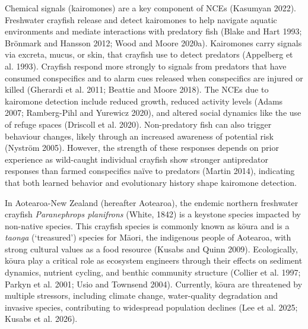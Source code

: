 \documentclass[
  12pt,
  a4paper,
]{scrbook}
\begin{document}
Chemical signals (kairomones) are a key component of NCEs (Kasumyan
2022). Freshwater crayfish release and detect kairomones to help
navigate aquatic environments and mediate interactions with predatory
fish (Blake and Hart 1993; Brönmark and Hansson 2012; Wood and Moore
2020a). Kairomones carry signals via excreta, mucus, or skin, that
crayfish use to detect predators (Appelberg et al. 1993). Crayfish
respond more strongly to signals from predators that have consumed
conspecifics and to alarm cues released when conspecifics are injured or
killed (Gherardi et al. 2011; Beattie and Moore 2018). The NCEs due to
kairomone detection include reduced growth, reduced activity levels
(Adams 2007; Ramberg-Pihl and Yurewicz 2020), and altered social
dynamics like the use of refuge spaces (Driscoll et al. 2020).
Non-predatory fish can also trigger behaviour changes, likely through an
increased awareness of potential risk (Nyström 2005). However, the
strength of these responses depends on prior experience as wild-caught
individual crayfish show stronger antipredator responses than farmed
conspecifics naïve to predators (Martin 2014), indicating that both
learned behavior and evolutionary history shape kairomone detection.

In Aotearoa-New Zealand (hereafter Aotearoa), the endemic northern
freshwater crayfish \emph{Paranephrops planifrons} (White, 1842) is a
keystone species impacted by non-native species. This crayfish species
is commonly known as kōura and is a \emph{taonga} (`treasured') species
for Māori, the indigenous people of Aotearoa, with strong cultural
values as a food resource (Kusabs and Quinn 2009). Ecologically, kōura
play a critical role as ecosystem engineers through their effects on
sediment dynamics, nutrient cycling, and benthic community structure
(Collier et al. 1997; Parkyn et al. 2001; Usio and Townsend 2004).
Currently, kōura are threatened by multiple stressors, including climate
change, water-quality degradation and invasive species, contributing to
widespread population declines (Lee et al. 2025; Kusabs et al. 2026).
\end{document}
